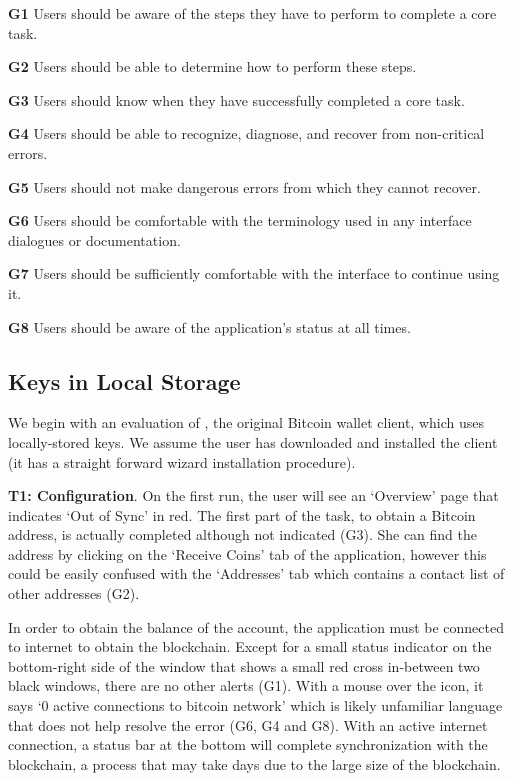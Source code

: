 \begin{compactlist}
	\item[\bf G1] Users should be aware of the steps they have to perform to complete a core task.
	\item[\bf G2] Users should be able to determine how to perform these steps.
	\item[\bf G3] Users should know when they have successfully completed a core task.
	\item[\bf G4] Users should be able to recognize, diagnose, and recover from non-critical errors.
	\item[\bf G5] Users should not make dangerous errors from which they cannot recover.
	\item[\bf G6] Users should be comfortable with the terminology used in any interface dialogues or documentation.
	\item[\bf G7] Users should be sufficiently comfortable with the interface to continue using it.
	\item[\bf G8] Users should be aware of the application's status at all times.
\end{compactlist}


\subsection{Keys in Local Storage}
We begin with an evaluation of \bitcoinclient, the original Bitcoin wallet client, which uses locally-stored keys. We assume the user has downloaded and installed the \bitcoinclient client (it has a straight forward wizard installation procedure).

\textbf{T1: Configuration}. 
On the first run, the user will see an `Overview' page that indicates `Out of Sync' in red. The first part of the task, to obtain a Bitcoin address, is actually completed although not indicated (G3). She can find the address by clicking on the `Receive Coins' tab of the application, however this could be easily confused with the `Addresses' tab which contains a contact list of other addresses (G2).

In order to obtain the balance of the account, the application must be connected to internet to obtain the blockchain. Except for a small status indicator on the bottom-right side of the window that shows a small red cross in-between two black windows, there are no other alerts (G1). With a mouse over the icon, it says `0 active connections to bitcoin network' which is likely unfamiliar language that does not help resolve the error (G6, G4 and G8). With an active internet connection, a status bar at the bottom will complete synchronization with the blockchain, a process that may take days due to the large size of the blockchain. 

